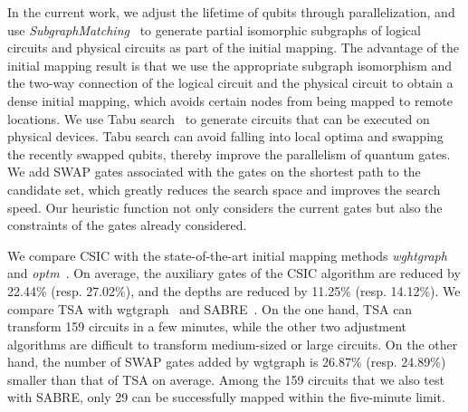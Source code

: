 \documentclass[journal]{IEEEtran}
\begin{document}
In the current work, we adjust the lifetime of qubits through parallelization, and use \emph{SubgraphMatching}~\cite{Sun2020} to generate partial isomorphic subgraphs of logical circuits %
and physical circuits %
as part of the initial mapping. The advantage of the initial mapping result is that we use the appropriate subgraph isomorphism and the two-way connection of the logical circuit and the physical circuit to obtain a dense initial mapping, which avoids certain nodes from being mapped to remote locations. We use Tabu search~\cite{Glover1990} to generate circuits that can be executed on physical devices. Tabu search can avoid falling into local optima and swapping the recently swapped qubits, thereby improve the parallelism of quantum gates. We add SWAP gates associated with the gates on the shortest path to the candidate set, which greatly reduces the search space and improves the search speed. Our heuristic function not only considers the current gates but also the constraints of the gates already considered.

We compare CSIC with the state-of-the-art initial mapping methods \emph{wghtgraph}~\cite{2020Qubit} and \emph{optm}~\cite{Zulehner2017}. On average, the auxiliary gates of the CSIC algorithm are reduced by 22.44\% (resp. 27.02\%), and the depths are reduced by 11.25\% (resp. 14.12\%). We compare TSA with wgtgraph~\cite{2020Qubit} and SABRE~\cite{Li2018}. On the one hand, TSA can transform 159 circuits in a few minutes, while the  other two adjustment algorithms are difficult to transform medium-sized or large circuits. On the other hand, the number of SWAP gates added by wgtgraph is 26.87\% (resp. 24.89\%) smaller than that of  TSA on average. Among the 159 circuits that we also test with SABRE, only 29  can be successfully mapped within the five-minute limit.
\end{document}
